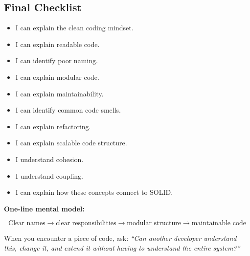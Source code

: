\documentclass[11pt,a4paper]{article}
\newcommand{\checkitem}{$\square$}
\begin{document}
\subsection{Final Checklist}

\begin{itemize}[label=\checkitem]
    \item I can explain the clean coding mindset.
    \item I can explain readable code.
    \item I can identify poor naming.
    \item I can explain modular code.
    \item I can explain maintainability.
    \item I can identify common code smells.
    \item I can explain refactoring.
    \item I can explain scalable code structure.
    \item I understand cohesion.
    \item I understand coupling.
    \item I can explain how these concepts connect to SOLID.
\end{itemize}

\begin{conceptbox}
\textbf{One-line mental model:}

\[
\boxed{
\text{Clear names}
\rightarrow
\text{clear responsibilities}
\rightarrow
\text{modular structure}
\rightarrow
\text{maintainable code}
}
\]

When you encounter a piece of code, ask:
\textit{``Can another developer understand this, change it, and extend it
without having to understand the entire system?''}
\end{conceptbox}
\end{document}
